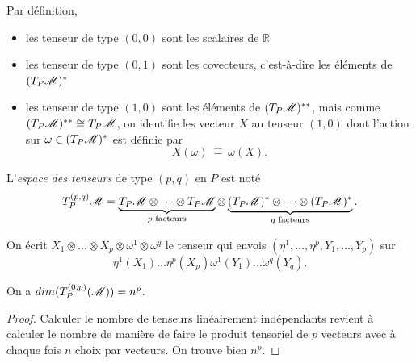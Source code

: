 \documentclass[a4paper,11pt]{report}
\begin{document}
                Par définition,
                \begin{itemize}[label = \textbullet]
                    \item les tenseur de type $(0,0)$ sont les scalaires de $\mathbb{R}$
                    \item les tenseur de type $(0,1)$ sont les covecteurs, c'est-à-dire les éléments de $(T_P\mathscr{M})^*$
                    \item les tenseur de type $(1,0)$ sont les éléments de $(T_P\mathscr{M})^{**}$, mais comme $(T_P\mathscr{M})^{**}\cong T_P\mathscr{M}$, on identifie les vecteur $X$ au tenseur $(1,0)$ dont l'action sur $\omega\in(T_P\mathscr{M})^*$ est définie par
                    \begin{equation}
                        X(\omega)~\hat{=}~\omega(X).
                    \end{equation}
                \end{itemize}
                
                \begin{defn}
                    L'\textit{espace des tenseurs} de type $(p,q)$ en $P$ est noté
                    \begin{equation}
                        T^{(p,q)}_P\mathscr{M} = \underbrace{T_P\mathscr{M}\otimes\dots\otimes T_P\mathscr{M}}_{\text{$p$ facteurs}}\otimes \underbrace{(T_P\mathscr{M})^*\otimes\dots\otimes (T_P\mathscr{M})^*}_{\text{$q$ facteurs}}.
                    \end{equation}
                \end{defn}
                
                On écrit $X_1\otimes\dots\otimes X_p\otimes\omega^1\otimes\omega^q$ le tenseur qui envois $(\eta^1,\dots,\eta^p,Y_1,\dots,Y_p)$ sur
                \begin{equation}
                    \eta^1(X_1)\dots\eta^p(X_p)\omega^1(Y_1)\dots\omega^q(Y_q).
                \end{equation}
                
                \begin{leftbar}
                \begin{prop}
                    On a $dim(T_P^{(0,p)}(\mathscr{M})) = n^p$.
                \end{prop}
                \end{leftbar}
                
                \begin{proof}
                    Calculer le nombre de tenseurs linéairement indépendants revient à calculer le nombre de manière de faire le produit tensoriel de $p$ vecteurs avec à chaque fois $n$ choix par vecteurs. On trouve bien $n^p$.
                \end{proof}
                
\end{document}
